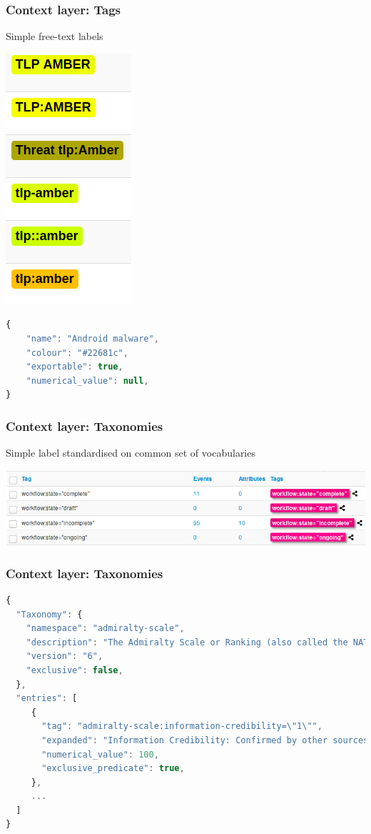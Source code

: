 \begin{frame}[fragile]
    \frametitle{Context layer: Tags}
    Simple free-text labels
    \begin{center}
        \includegraphics[scale=0.45]{screenshots/creativity.png}
    \end{center}
    \begin{lstlisting}[language=javascript,firstnumber=1]
{
    "name": "Android malware",
    "colour": "#22681c",
    "exportable": true,
    "numerical_value": null,
}
\end{lstlisting}
\end{frame}

\begin{frame}
    \frametitle{Context layer: Taxonomies}
    Simple label standardised on common set of vocabularies
    \vspace{1em}
    \begin{center}
        \includegraphics[width=1.0\linewidth]{taxonomy-workflow.png}
    \end{center}
\end{frame}

\begin{frame}[fragile]
    \frametitle{Context layer: Taxonomies}
    \begin{lstlisting}[language=javascript,firstnumber=1]
{
  "Taxonomy": {
    "namespace": "admiralty-scale",
    "description": "The Admiralty Scale or Ranking (also called the NATO System)...",
    "version": "6",
    "exclusive": false,
  },
  "entries": [
     {
       "tag": "admiralty-scale:information-credibility=\"1\"",
       "expanded": "Information Credibility: Confirmed by other sources",
       "numerical_value": 100,
       "exclusive_predicate": true,
     },
     ...
  ]
}
\end{lstlisting}
\end{frame}


